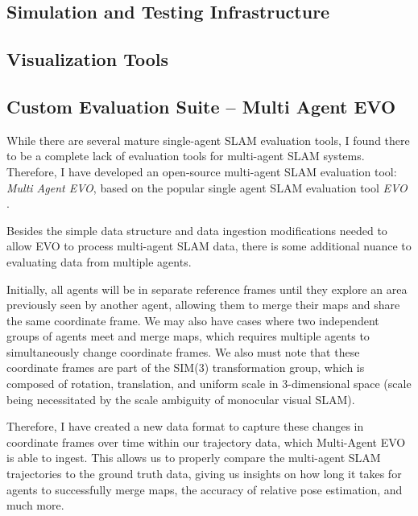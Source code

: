 

\subsection{Simulation and Testing Infrastructure}
\label{sec:simulation-and-testing-infrastructure}

\subsection{Visualization Tools}
\label{sec:visualization-tools}

\subsection{Custom Evaluation Suite – Multi Agent EVO}
\label{sec:multi-agent-evo}
While there are several mature single-agent SLAM evaluation tools, I found there to be a complete lack of evaluation tools for multi-agent SLAM systems. Therefore, I have developed an open-source multi-agent SLAM evaluation tool: \textit{Multi Agent EVO}, based on the popular single agent SLAM evaluation tool \textit{EVO} \autocite{grupp2017evo}.

Besides the simple data structure and data ingestion modifications needed to allow EVO to process multi-agent SLAM data, there is some additional nuance to evaluating data from multiple agents.

Initially, all agents will be in separate reference frames until they explore an area previously seen by another agent, allowing them to merge their maps and share the same coordinate frame. We may also have cases where two independent groups of agents meet and merge maps, which requires multiple agents to simultaneously change coordinate frames. We also must note that these coordinate frames are part of the SIM(3) transformation group, which is composed of rotation, translation, and uniform scale in 3-dimensional space (scale being necessitated by the scale ambiguity of monocular visual SLAM).

Therefore, I have created a new data format to capture these changes in coordinate frames over time within our trajectory data, which Multi-Agent EVO is able to ingest. This allows us to properly compare the multi-agent SLAM trajectories to the ground truth data, giving us insights on how long it takes for agents to successfully merge maps, the accuracy of relative pose estimation, and much more.

